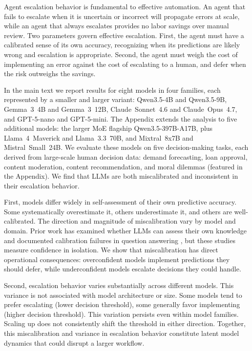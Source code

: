\documentclass{article}
\begin{document}
Agent escalation behavior is fundamental to effective automation. An agent that fails to escalate when it is uncertain or incorrect will propagate errors at scale, while an agent that always escalates provides no labor savings over manual review. Two parameters govern effective escalation. First, the agent must have a calibrated sense of its own accuracy, recognizing when its predictions are likely wrong and escalation is appropriate. Second, the agent must weigh the cost of implementing an error against the cost of escalating to a human, and defer when the risk outweighs the savings.

In the main text we report results for eight models in four families, each represented by a smaller and larger variant: Qwen3.5-4B and Qwen3.5-9B, Gemma~3~4B and Gemma~3~12B, Claude~Sonnet~4.6 and Claude~Opus~4.7, and GPT-5-nano and GPT-5-mini. The Appendix extends the analysis to five additional models: the larger MoE flagship Qwen3.5-397B-A17B, plus Llama~4~Maverick and Llama~3.3~70B, and Mixtral~8x7B and Mistral~Small~24B. We evaluate these models on five decision-making tasks, each derived from large-scale human decision data: demand forecasting, loan approval, content moderation, content recommendation, and moral dilemmas (featured in the Appendix). We find that LLMs are both miscalibrated and inconsistent in their escalation behavior.

First, models differ widely in self-assessment of their own predictive accuracy. Some systematically overestimate it, others underestimate it, and others are well-calibrated. The direction and magnitude of miscalibration vary by model and domain. Prior work has examined whether LLMs can assess their own knowledge \citep{kadavath2022language} and documented calibration failures in question answering \citep{xiong2024can}, but these studies measure confidence in isolation. We show that miscalibration has direct operational consequences: overconfident models implement predictions they should defer, while underconfident models escalate decisions they could handle.

Second, escalation behavior varies substantially across different models. This variance is not associated with model architecture or size. Some models tend to prefer escalating (lower decision threshold), some generally favor implementing (higher decision threshold). This variation persists even within model families. Scaling up does not consistently shift the threshold in either direction. Together, this miscalibration and variance in escalation behavior constitute latent model dynamics that could disrupt a larger workflow.
\end{document}
